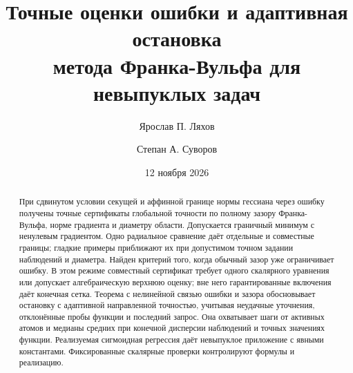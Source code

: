 \documentclass[a4paper,11pt]{article}
\title{Точные оценки ошибки и адаптивная остановка\\метода Франка-Вульфа для невыпуклых задач}
\author{Ярослав П. Ляхов \and Степан А. Суворов}
\date{12 ноября 2026}
\begin{document}
\maketitle
\begin{abstract}
При сдвинутом условии секущей и аффинной границе нормы гессиана
через ошибку получены точные сертификаты глобальной точности по
полному зазору Франка-Вульфа, норме градиента и диаметру области.
Допускается граничный минимум с ненулевым градиентом. Одно радиальное
сравнение даёт отдельные и совместные границы; гладкие примеры
приближают их при допустимом точном задании наблюдений и диаметра. Найден
критерий того, когда обычный зазор уже ограничивает ошибку. В этом
режиме совместный сертификат требует одного скалярного уравнения
или допускает алгебраическую верхнюю оценку; вне него гарантированные
включения даёт конечная сетка. Теорема с нелинейной связью ошибки
и зазора обосновывает остановку с адаптивной направленной точностью,
учитывая неудачные уточнения, отклонённые пробы функции и последний
запрос. Она охватывает шаги от активных атомов и медианы средних при конечной
дисперсии наблюдений и точных значениях функции. Реализуемая
сигмоидная регрессия даёт невыпуклое приложение с явными константами.
Фиксированные скалярные проверки контролируют формулы и реализацию.
\end{abstract}













\end{document}
